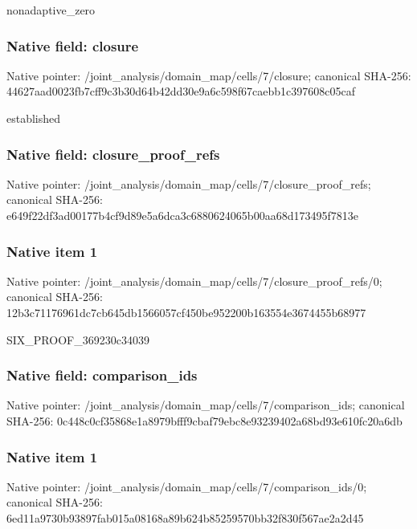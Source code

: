 \documentclass[10pt,a4paper]{article}
\begin{document}
\begingroup\raggedright\sloppy nonadaptive\_\allowbreak{}zero\par\endgroup

\subsubsection{Native field: closure}
Native pointer: /joint\_\allowbreak{}analysis/domain\_\allowbreak{}map/cells/7/closure; canonical SHA-256: 44627aad0023fb7cff9c3b30d64b42dd30e9a6c598f67caebb1c397608c05caf

\begingroup\raggedright\sloppy established\par\endgroup

\subsubsection{Native field: closure\_\allowbreak{}proof\_\allowbreak{}refs}
Native pointer: /joint\_\allowbreak{}analysis/domain\_\allowbreak{}map/cells/7/closure\_\allowbreak{}proof\_\allowbreak{}refs; canonical SHA-256: e649f22df3ad00177b4cf9d89e5a6dca3c6880624065b00aa68d173495f7813e

\subsubsection{Native item 1}
Native pointer: /joint\_\allowbreak{}analysis/domain\_\allowbreak{}map/cells/7/closure\_\allowbreak{}proof\_\allowbreak{}refs/0; canonical SHA-256: 12b3c71176961dc7cb645db1566057cf450be952200b163554e3674455b68977

\begingroup\raggedright\sloppy SIX\_\allowbreak{}PROOF\_\allowbreak{}369230c34039\par\endgroup

\subsubsection{Native field: comparison\_\allowbreak{}ids}
Native pointer: /joint\_\allowbreak{}analysis/domain\_\allowbreak{}map/cells/7/comparison\_\allowbreak{}ids; canonical SHA-256: 0c448c0cf35868e1a8979bfff9cbaf79ebc8e93239402a68bd93e610fc20a6db

\subsubsection{Native item 1}
Native pointer: /joint\_\allowbreak{}analysis/domain\_\allowbreak{}map/cells/7/comparison\_\allowbreak{}ids/0; canonical SHA-256: 6ed11a9730b93897fab015a08168a89b624b85259570bb32f830f567ae2a2d45
\end{document}
